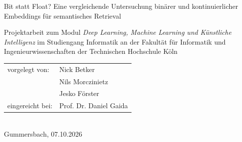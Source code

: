 \begin{titlepage}
%
\sffamily%
%
\begin{center}
\end{center}
%
\vfill
%
\begin{huge}
Bit statt Float? Eine vergleichende Untersuchung binärer und kontinuierlicher Embeddings für semantisches Retrieval\\[10mm]
\end{huge}
%
Projektarbeit\newline
zum Modul \emph{Deep Learning, Machine Learning und Künstliche Intelligenz}\newline
im Studiengang Informatik\newline
an der Fakultät für Informatik und Ingenieurwissenschaften\newline
der Technischen Hochschule Köln
%
\vfill
%
\begin{tabular}{@{}ll}
vorgelegt von: & Nick Betker\\
               & Nils Morczinietz\\
               & Jesko Förster\\[5mm]
eingereicht bei:   & Prof. Dr. Daniel Gaida\\
\end{tabular}	
%
\\[10mm]
%
Gummersbach, 07.10.2026%
%
\rmfamily%
%
\end{titlepage}